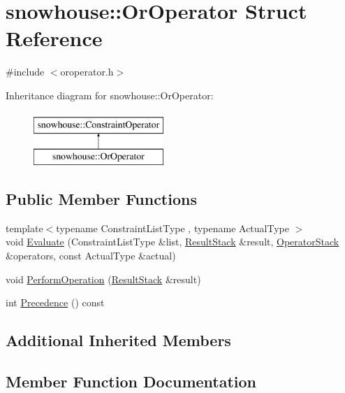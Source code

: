\hypertarget{structsnowhouse_1_1OrOperator}{}\section{snowhouse\+::Or\+Operator Struct Reference}
\label{structsnowhouse_1_1OrOperator}


{\ttfamily \#include $<$oroperator.\+h$>$}

Inheritance diagram for snowhouse\+::Or\+Operator\+:\begin{figure}[H]
\begin{center}
\leavevmode
\includegraphics[height=2.000000cm]{structsnowhouse_1_1OrOperator}
\end{center}
\end{figure}
\subsection*{Public Member Functions}
\begin{DoxyCompactItemize}
\item 
{\footnotesize template$<$typename Constraint\+List\+Type , typename Actual\+Type $>$ }\\void \mbox{\hyperlink{structsnowhouse_1_1OrOperator_aac993a6b939c5bdfc431f7869d6edec3}{Evaluate}} (Constraint\+List\+Type \&list, \mbox{\hyperlink{namespacesnowhouse_a719169b1315a13161c15f25e600a8f51}{Result\+Stack}} \&result, \mbox{\hyperlink{namespacesnowhouse_adcb10e215e6a4bbcb35722a9c7270fc6}{Operator\+Stack}} \&operators, const Actual\+Type \&actual)
\item 
void \mbox{\hyperlink{structsnowhouse_1_1OrOperator_abd9c1f7e6b6867e83a0e7b0bbaa75f02}{Perform\+Operation}} (\mbox{\hyperlink{namespacesnowhouse_a719169b1315a13161c15f25e600a8f51}{Result\+Stack}} \&result)
\item 
int \mbox{\hyperlink{structsnowhouse_1_1OrOperator_af0c0077685e16330a75b0c96f29ed405}{Precedence}} () const
\end{DoxyCompactItemize}
\subsection*{Additional Inherited Members}


\subsection{Member Function Documentation}
\mbox{\label{structsnowhouse_1_1OrOperator_aac993a6b939c5bdfc431f7869d6edec3}} 
